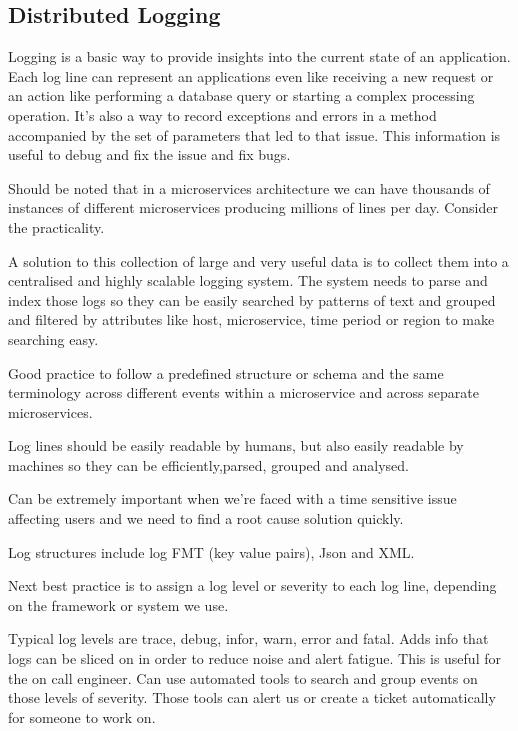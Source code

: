 \documentclass[a4paper, 11pt]{book}
\begin{document}
    \subsection{Distributed Logging}

    Logging is a basic way to provide insights into the current state of an application.
    Each log line can represent an applications even like receiving a new request or an action like performing a database query or starting a complex processing operation.
    It's also a way to record exceptions and errors in a method accompanied by the set of parameters that led to that issue.
    This information is useful to debug and fix the issue and fix bugs.

    Should be noted that in a microservices architecture we can have thousands of instances of different microservices producing millions of lines per day.
    Consider the practicality.

    A solution to this collection of large and very useful data is to collect them into a centralised and highly scalable logging system.
    The system needs to parse and index those logs so they can be easily searched by patterns of text and grouped and filtered by attributes like host, microservice, time period or region to make searching easy.

    Good practice to follow a predefined structure or schema and the same terminology across different events within a microservice and across separate microservices.

    Log lines should be easily readable by humans, but also easily readable by machines so they can be efficiently,parsed, grouped and analysed.

    Can be extremely important when we're faced with a time sensitive issue affecting users and we need to find a root cause solution quickly.

    Log structures include log FMT (key value pairs), Json and XML.

    Next best practice is to assign a log level or severity to each log line, depending on the framework or system we use.

    Typical log levels are trace, debug, infor, warn, error and fatal.
    Adds info that logs can be sliced on in order to reduce noise and alert fatigue.
    This is useful for the on call engineer.
    Can use automated tools to search and group events on those levels of severity.
    Those tools can alert us or create a ticket automatically for someone to work on.
\end{document}
